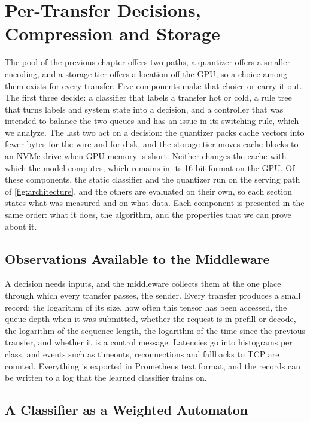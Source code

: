 \chapter{Per-Transfer Decisions, Compression and Storage}
\label{ch:deciding}

The pool of the previous chapter offers two paths, a quantizer offers a smaller
encoding, and a storage tier offers a location off the GPU, so a choice among
them exists for every transfer. Five components make that choice or carry
it out. The first three decide: a
classifier that labels a transfer hot or cold, a rule tree that turns labels
and system state into a decision, and a controller that was intended to
balance the two queues and has an issue in its switching rule, which we
analyze. The last two act
on a decision: the quantizer packs cache vectors into fewer bytes for the
wire and for disk, and the storage tier moves cache blocks to an NVMe drive
when GPU memory is short. Neither changes the cache with which the model
computes, which remains in its 16-bit format on the GPU. Of these components, the static classifier and the quantizer run on the
serving path of \cref{fig:architecture}, and the others are evaluated on
their own, so each section states what was measured and on what data. Each
component is presented in the same order: what it does, the algorithm, and
the properties that we can prove about it.

\section{Observations Available to the Middleware}
\label{sec:observations}

A decision needs inputs, and the middleware collects them at the one place
through which every transfer passes, the sender. Every transfer produces a
small record: the logarithm of its size, how often
this tensor has been accessed, the queue depth when it was submitted, whether
the request is in prefill or decode, the logarithm of the sequence length, the
logarithm of the time since the previous transfer, and whether it is a control
message. Latencies go into histograms per class, and events such as timeouts,
reconnections and fallbacks to TCP are counted. Everything is exported in
Prometheus text format, and the records can be written to a log that the
 learned classifier trains on.

\section{A Classifier as a Weighted Automaton}
\label{sec:classifier}

